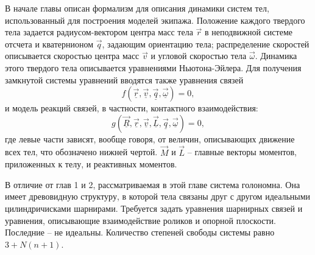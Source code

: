 В начале главы описан формализм для описания динамики систем тел, использованный для построения моделей экипажа. Положение каждого твердого тела задается радиусом-вектором центра масс тела $\vec{r}$ в неподвижной системе отсчета и кватернионом $\vec{q}$, задающим ориентацию тела; распределение скоростей описывается скоростью центра масс $\vec{v}$ и угловой скоростью тела $\vec{\omega}$.
Динамика этого твердого тела описывается уравнениями Ньютона-Эйлера.
Для получения замкнутой системы уравнений вводятся также уравнения связей 
\begin{equation}\label{eq:mo_cstr}
    f(\vec{\underline{r}}, \vec{\underline{v}}, \vec{\underline{q}}, \vec{\underline{\omega}}) = 0,
\end{equation}
и модель реакций связей, в частности, контактного взаимодействия:
\begin{equation}\label{eq:mo_reac}
    g(\vec{\underline{R}}, \vec{\underline{r}}, \vec{\underline{v}}, \vec{\underline{L}}, \vec{\underline{q}}, \vec{\underline{\omega}}) = 0,
\end{equation}
где левые части зависят, вообще говоря, от величин, описывающих движение всех тел, что обозначено нижней чертой. $\vec{M}$ и $\vec{L}$ -- главные векторы моментов, приложенных к телу, и реактивных моментов.

В отличие от глав 1 и 2, рассматриваемая в этой главе система голономна. Она имеет древовидную структуру, в которой тела связаны друг с другом идеальными цилиндричисками шарнирами. Требуется задать уравнения шарнирных связей и уравнения, описывающие взаимодействие роликов и опорной плоскости. Последние -- не идеальны. Количество степеней свободы системы равно $3 + N(n + 1)$.

